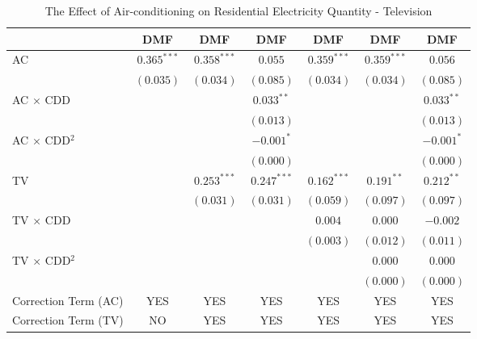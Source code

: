 
\begin{table}[htbp]
\caption{The Effect of Air-conditioning on Residential Electricity Quantity - Television}
\begin{center}
\begin{tabular}{l c c c c c c}
\hline
 & DMF & DMF & DMF & DMF & DMF & DMF \\
\hline
AC                      & $0.365^{***}$ & $0.358^{***}$ & $0.055$       & $0.359^{***}$ & $0.359^{***}$ & $0.056$      \\
                        & $(0.035)$     & $(0.034)$     & $(0.085)$     & $(0.034)$     & $(0.034)$     & $(0.085)$    \\
AC $\times$ CDD         &               &               & $0.033^{**}$  &               &               & $0.033^{**}$ \\
                        &               &               & $(0.013)$     &               &               & $(0.013)$    \\
AC $\times$ CDD$^2$     &               &               & $-0.001^{*}$  &               &               & $-0.001^{*}$ \\
                        &               &               & $(0.000)$     &               &               & $(0.000)$    \\
TV                      &               & $0.253^{***}$ & $0.247^{***}$ & $0.162^{***}$ & $0.191^{**}$  & $0.212^{**}$ \\
                        &               & $(0.031)$     & $(0.031)$     & $(0.059)$     & $(0.097)$     & $(0.097)$    \\
TV $\times$ CDD         &               &               &               & $0.004$       & $0.000$       & $-0.002$     \\
                        &               &               &               & $(0.003)$     & $(0.012)$     & $(0.011)$    \\
TV $\times$ CDD$^2$     &               &               &               &               & $0.000$       & $0.000$      \\
                        &               &               &               &               & $(0.000)$     & $(0.000)$    \\
\hline
Correction Term (AC)    & YES           & YES           & YES           & YES           & YES           & YES          \\
Correction Term (TV)    & NO            & YES           & YES           & YES           & YES           & YES          \\

\end{tabular}
\end{center}
\end{table}
